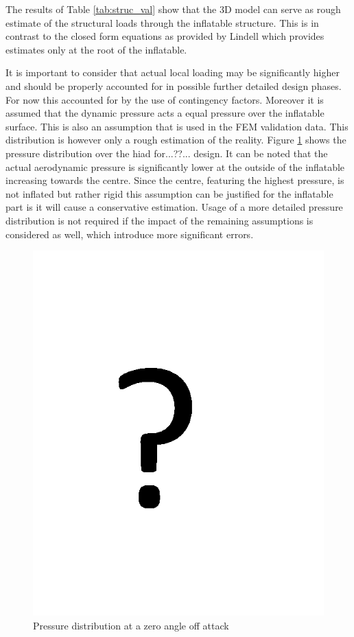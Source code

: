 The results of Table \ref{tab:struc_val} show that the 3D model can serve as rough estimate of the structural loads through the inflatable structure. This is in contrast to the closed form equations as provided by Lindell\cite{Lindell2006} which provides estimates only at the root of the inflatable. 

It is important to consider that actual local loading may be significantly higher and should be properly accounted for in possible further detailed design phases. For now this accounted for by the use of contingency factors. Moreover it is assumed that the dynamic pressure acts a equal pressure over the inflatable surface. This is also an assumption that is used in the FEM validation data. This distribution is however only a rough estimation of the reality. Figure \ref{fig:struc_pres} shows the pressure distribution over the \gls{hiad} for...??... design. It can be noted that the actual aerodynamic pressure is significantly lower at the outside of the inflatable increasing towards the centre. Since the centre, featuring the highest pressure, is not inflated but rather rigid this assumption can be justified for the inflatable part is it will cause a conservative estimation. Usage of a more detailed pressure distribution is not required if the impact of the remaining assumptions is considered as well, which introduce more significant errors.

\begin{figure}[b]
\centering
\includegraphics[width=1.0\textwidth]{./Figure/Structure/temp.png}
\caption{Pressure distribution at a zero angle off attack} 
\label{fig:struc_pres}
\end{figure}

